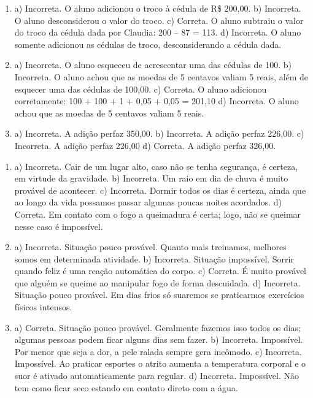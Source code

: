 \begin{enumerate}
\item
a) Incorreta. O aluno adicionou o troco à cédula de R\$ 200,00.
b) Incorreta. O aluno desconsiderou o valor do troco.
c) Correta. O aluno subtraiu o valor do troco da cédula dada por Claudia: 200 -- 87 = 113.
d) Incorreta. O aluno somente adicionou as cédulas de troco, desconsiderando a cédula dada.

\item
a) Incorreta. O aluno esqueceu de acrescentar uma das cédulas de 100.
b) Incorreta. O aluno achou que as moedas de 5 centavos valiam 5 reais, além de esquecer uma das cédulas de 100,00.
c) Correta. O aluno adicionou corretamente: 100 + 100 + 1 + 0,05 + 0,05 = 201,10
d) Incorreta. O aluno achou que as moedas de 5 centavos valiam 5 reais.

\item
a) Incorreta. A adição perfaz 350,00.
b) Incorreta. A adição perfaz 226,00.
c) Incorreta. A adição perfaz 226,00
d) Correta. A adição perfaz 326,00.
\end{enumerate}


\begin{enumerate}
\item
a) Incorreta. Cair de um lugar alto, caso não se tenha segurança, é certeza, em virtude da gravidade.
b) Incorreta. Um raio em dia de chuva é muito provável de acontecer.
c) Incorreta. Dormir todos os dias é certeza, ainda que ao longo da vida possamos passar algumas poucas noites acordados.
d) Correta. Em contato com o fogo a queimadura é certa; logo, não se queimar nesse caso é impossível.

\item
a) Incorreta. Situação pouco provável. Quanto mais treinamos, melhores somos em determinada atividade.
b) Incorreta. Situação impossível. Sorrir quando feliz é uma reação
automática do corpo.
c) Correta. É muito provável que alguém se queime ao manipular fogo de
forma descuidada.
d) Incorreta. Situação pouco provável. Em dias frios só suaremos se
praticarmos exercícios físicos intensos.

\item
a) Correta. Situação pouco provável. Geralmente fazemos isso todos os
dias; algumas pessoas podem ficar alguns dias sem fazer.
b) Incorreta. Impossível. Por menor que seja a dor, a pele ralada sempre gera incômodo.
c) Incorreta. Impossível. Ao praticar esportes o atrito aumenta a
temperatura corporal e o suor é ativado automaticamente para regular.
d) Incorreta. Impossível. Não tem como ficar seco estando em contato direto com a água.
\end{enumerate}

